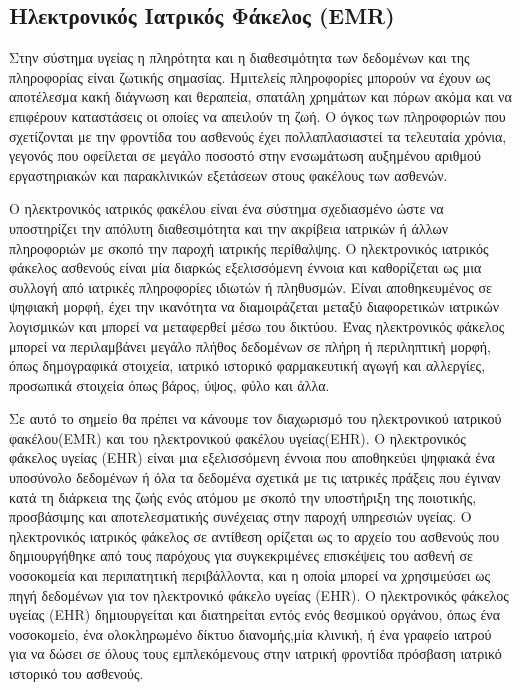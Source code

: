 	

	
	\subsection{Ηλεκτρονικός Ιατρικός Φάκελος (EMR)}
	

		Στην σύστημα υγείας η πληρότητα και η διαθεσιμότητα των δεδομένων και της πληροφορίας είναι ζωτικής σημασίας. Ημιτελείς πληροφορίες μπορούν να έχουν ως αποτέλεσμα κακή διάγνωση και θεραπεία, σπατάλη χρημάτων και πόρων ακόμα και να επιφέρουν καταστάσεις οι οποίες να απειλούν τη ζωή. Ο όγκος των πληροφοριών που σχετίζονται με την φροντίδα του ασθενούς έχει πολλαπλασιαστεί τα τελευταία χρόνια, γεγονός που οφείλεται σε μεγάλο ποσοστό στην ενσωμάτωση αυξημένου αριθμού εργαστηριακών και παρακλινικών εξετάσεων στους φακέλους των ασθενών.
	
		Ο ηλεκτρονικός ιατρικός φακέλου είναι ένα σύστημα σχεδιασμένο ώστε να υποστηρίζει την απόλυτη διαθεσιμότητα και την ακρίβεια ιατρικών ή άλλων πληροφοριών με σκοπό την παροχή ιατρικής περίθαλψης. Ο ηλεκτρονικός ιατρικός φάκελος ασθενούς είναι μία διαρκώς εξελισσόμενη έννοια και καθορίζεται ως μια συλλογή από ιατρικές πληροφορίες ιδιωτών ή πληθυσμών. Είναι αποθηκευμένος σε ψηφιακή μορφή, έχει την ικανότητα να διαμοιράζεται μεταξύ διαφορετικών ιατρικών λογισμικών και μπορεί να μεταφερθεί μέσω του δικτύου. Ένας ηλεκτρονικός φάκελος μπορεί να περιλαμβάνει μεγάλο πλήθος δεδομένων σε πλήρη ή περιληπτική μορφή, όπως δημογραφικά στοιχεία, ιατρικό ιστορικό φαρμακευτική αγωγή και αλλεργίες, προσωπικά στοιχεία όπως βάρος, ύψος, φύλο και άλλα.
		
		Σε αυτό το σημείο θα πρέπει να κάνουμε τον διαχωρισμό του ηλεκτρονικού ιατρικού φακέλου(EMR) και του ηλεκτρονικού φακέλου υγείας(EHR). O ηλεκτρονικός φάκελος υγείας (EHR) είναι μια εξελισσόμενη έννοια 
που αποθηκεύει ψηφιακά ένα υποσύνολο δεδομένων ή όλα τα δεδομένα σχετικά με τις ιατρικές πράξεις που έγιναν κατά τη διάρκεια της ζωής ενός ατόμου με σκοπό την υποστήριξη της ποιοτικής, προσβάσιμης και αποτελεσματικής συνέχειας στην παροχή υπηρεσιών υγείας. Ο ηλεκτρονικός ιατρικός φάκελος σε αντίθεση ορίζεται ως το αρχείο του ασθενούς που δημιουργήθηκε από τους παρόχους για συγκεκριμένες επισκέψεις του ασθενή σε νοσοκομεία και περιπατητική περιβάλλοντα, και η οποία μπορεί να χρησιμεύσει ως πηγή δεδομένων για τον ηλεκτρονικό φάκελο υγείας (EHR). Ο ηλεκτρονικός φάκελος υγείας (EHR) δημιουργείται και διατηρείται εντός ενός θεσμικού οργάνου, όπως ένα νοσοκομείο, ένα ολοκληρωμένο δίκτυο διανομής,μία κλινική, ή ένα γραφείο ιατρού για να δώσει σε όλους τους εμπλεκόμενους στην ιατρική φροντίδα πρόσβαση ιατρικό ιστορικό του ασθενούς.
	
